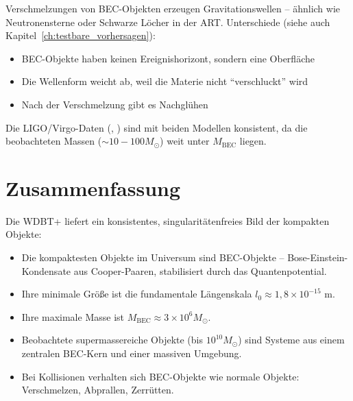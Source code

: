 Verschmelzungen von BEC-Objekten erzeugen Gravitationswellen – ähnlich wie Neutronensterne oder Schwarze Löcher in der ART. Unterschiede (siehe auch Kapitel~\ref{ch:testbare_vorhersagen}):

\begin{itemize}
    \item BEC-Objekte haben keinen Ereignishorizont, sondern eine Oberfläche
    \item Die Wellenform weicht ab, weil die Materie nicht \enquote{verschluckt} wird
    \item Nach der Verschmelzung gibt es Nachglühen
\end{itemize}

Die LIGO/Virgo-Daten (\cite{LIGO2016}, \cite{LIGO2017}) sind mit beiden Modellen konsistent, da die beobachteten Massen (\( \sim 10 - 100 M_\odot \)) weit unter \( M_{\text{BEC}} \) liegen.

\section{Zusammenfassung}
\label{sec:bec_zusammenfassung}

Die WDBT+ liefert ein konsistentes, singularitätenfreies Bild der kompakten Objekte:

\begin{itemize}
    \item Die kompaktesten Objekte im Universum sind BEC-Objekte – Bose-Einstein-Kondensate aus Cooper-Paaren, stabilisiert durch das Quantenpotential.
    \item Ihre minimale Größe ist die fundamentale Längenskala \( l_0 \approx 1,8 \times 10^{-15} \) m.
    \item Ihre maximale Masse ist \( M_{\text{BEC}} \approx 3 \times 10^6 M_\odot \).
    \item Beobachtete supermassereiche Objekte (bis \( 10^{10} M_\odot \)) sind Systeme aus einem zentralen BEC-Kern und einer massiven Umgebung.
    \item Bei Kollisionen verhalten sich BEC-Objekte wie normale Objekte: Verschmelzen, Abprallen, Zerrütten.
\end{itemize}